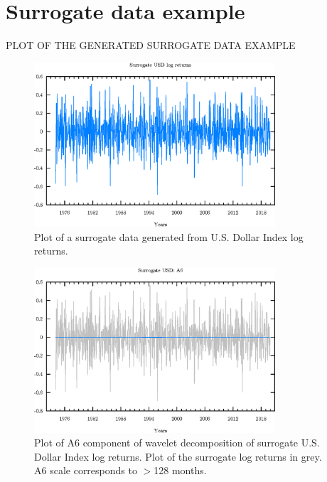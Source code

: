 \appendix
\newpage
\section{Surrogate data example} \label{appendix:surrogate-example}

PLOT OF THE GENERATED SURROGATE DATA EXAMPLE

\begin{figure}[h]
\begin{center}
\includegraphics[width=0.8\textwidth]{./code/plot/surrogate_dollar_logret.eps}
\caption{Plot of a surrogate data generated from U.S. Dollar Index log returns.}
\label{fig:s-usd-logret}
\end{center}
\end{figure}

\begin{figure}
\begin{center}
\includegraphics[width=0.8\textwidth]{./code/plot/surrogate_usd_wr_A6.eps}
\caption{Plot of A6 component of wavelet decomposition of surrogate U.S. Dollar Index log returns. 
	Plot of the surrogate log returns in grey. A6 scale corresponds to $>$128 months.}
\end{center}
\label{fig:s-usd-wr-a6}
\end{figure}

